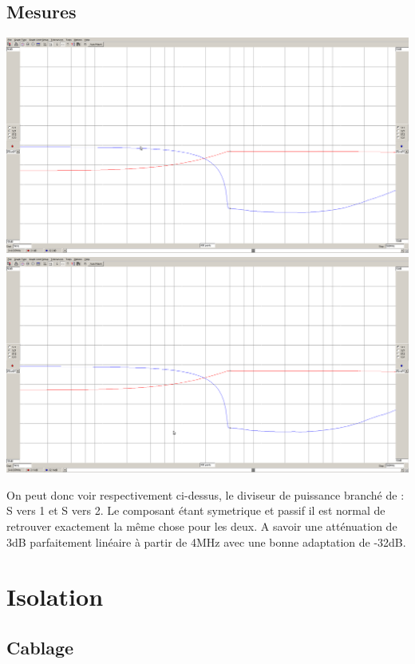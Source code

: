 \documentclass[a4paper,12pt]{report}            %
\begin{document}
\subsection{Mesures}
\begin{center}
	\includegraphics[scale = 0.25]{pic/div_ps1.png} \\
	\includegraphics[scale = 0.25]{pic/div_ps2.png}
\end{center}
On peut donc voir respectivement ci-dessus, le diviseur de puissance branché de :
S vers 1 et S vers 2. Le composant étant symetrique et passif il est normal de retrouver
exactement la même chose pour les deux. A savoir une atténuation de 3dB parfaitement linéaire
à partir de 4MHz avec une bonne adaptation de -32dB.
\section{Isolation}
\subsection{Cablage}
\end{document}
